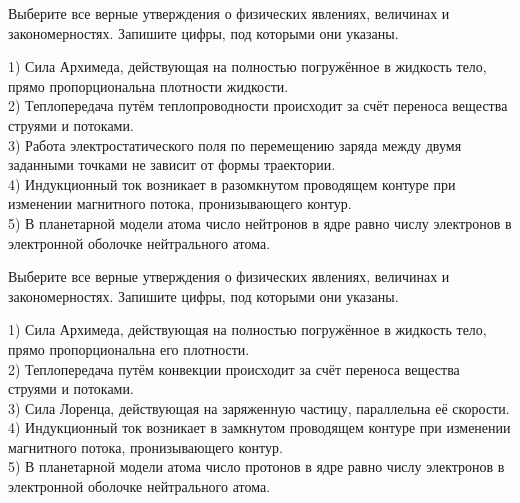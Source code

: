 \begin{taskbasic}[code={\label{task:kim18_v05}}]
Выберите все верные утверждения о физических явлениях, величинах и закономерностях. Запишите цифры, под которыми они указаны.

1) Сила Архимеда, действующая на полностью погружённое в жидкость тело, прямо пропорциональна плотности жидкости.\\
2) Теплопередача путём теплопроводности происходит за счёт переноса вещества струями и потоками.\\
3) Работа электростатического поля по перемещению заряда между двумя заданными точками не зависит от формы траектории.\\
4) Индукционный ток возникает в разомкнутом проводящем контуре при изменении магнитного потока, пронизывающего контур.\\
5) В планетарной модели атома число нейтронов в ядре равно числу электронов в электронной оболочке нейтрального атома.

\end{taskbasic}

\begin{taskbasic}[code={\label{task:kim18_v06}}]
Выберите все верные утверждения о физических явлениях, величинах и закономерностях. Запишите цифры, под которыми они указаны.

1) Сила Архимеда, действующая на полностью погружённое в жидкость тело, прямо пропорциональна его плотности.\\
2) Теплопередача путём конвекции происходит за счёт переноса вещества струями и потоками.\\
3) Сила Лоренца, действующая на заряженную частицу, параллельна её скорости.\\
4) Индукционный ток возникает в замкнутом проводящем контуре при изменении магнитного потока, пронизывающего контур.\\
5) В планетарной модели атома число протонов в ядре равно числу электронов в электронной оболочке нейтрального атома.

\end{taskbasic}

